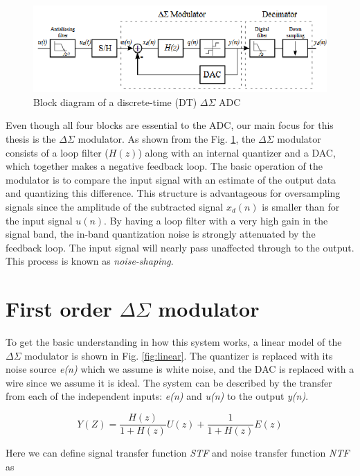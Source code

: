 \begin{figure}[h]
\centering
\includegraphics[scale=0.75]{images/delta_sigma_block.png}
\caption{Block diagram of a discrete-time (DT) $\Delta\Sigma$ ADC\cite{deltapic}}
\label{fig:delta_block}
\end{figure}

Even though all four blocks are essential to the ADC, our main focus for this thesis is the $\Delta\Sigma$ modulator. As shown from the Fig. \ref{fig:delta_block}, the $\Delta\Sigma$ modulator consists of a loop filter ($H(z)$) along with an internal quantizer and a DAC, which together makes a negative feedback loop. The basic operation of the modulator is to compare the input signal with an estimate of the output data and quantizing this difference. This structure is advantageous for oversampling signals since the amplitude of the subtracted signal $x_d(n)$ is smaller than for the input signal $u(n)$. By having a loop filter with a very high gain in the signal band, the in-band quantization noise is strongly attenuated by the feedback loop. The input signal will nearly pass unaffected through to the output. This process is known as \textit{noise-shaping}.

\section{First order $\Delta\Sigma$ modulator}\label{first_order}
To get the basic understanding in how this system works, a linear model of the $\Delta\Sigma$ modulator is shown in Fig. \ref{fig:linear}. The quantizer is replaced with its noise source \textit{e(n)} which we assume is white noise, and the DAC is replaced with a wire since we assume it is ideal. The system can be described by the transfer from each of the independent inputs: \textit{e(n)} and \textit{u(n)} to the output \textit{y(n)}. 

\begin{equation}
    Y(Z) = \frac{H(z)}{1+H(z)}U(z) + \frac{1}{1+H(z)}E(z)
\end{equation}

Here we can define signal transfer function \textit{STF} and noise transfer function \textit{NTF} as


